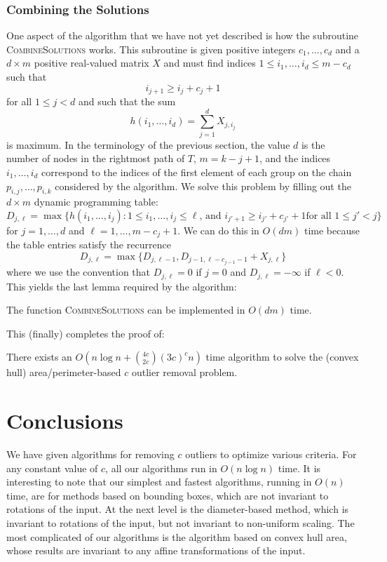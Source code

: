 \documentclass{elsart}
\newcommand{\runtime}{n\log n + {4c\choose 2c}(3c)^cn}
\newcommand{\Oruntime}{O\left(\runtime\right)}
\begin{document}
\subsubsection{Combining the Solutions}

One aspect of the algorithm that we have not yet described is how the
subroutine \textsc{CombineSolutions} works.  This subroutine is given
positive integers $c_1,\ldots,c_d$ and a $d\times m$ positive
real-valued matrix $X$ and must find 
indices $1\le i_1,\ldots,i_d \le m-c_d$ such that
\[
     i_{j+1} \ge i_j + c_j + 1
\]
for all $1\le j < d$ and such that the sum
\[
      h(i_1,\ldots,i_d)=\sum_{j=1}^d X_{j,i_j}
\]
is maximum.  In the terminology of the previous section, the value $d$
is the number of nodes in the rightmost path of $T$, $m=k-j+1$, and
the indices
$i_1,\ldots,i_d$ correspond to the indices of the
first element of each group on the chain $p_{i,j},\ldots,p_{i,k}$
considered by the algorithm.
We solve this problem by filling out the $d\times m$ dynamic
programming table:
\[
     D_{j,\ell} = \max\{h(i_1,\ldots,i_j):
      \mbox{$1\le i_1,\ldots,i_j\le \ell$, and $i_{j'+1} \ge i_{j'}+c_{j'}+1$
             for all $1\le j'< j$}  \} 
\]
for $j=1,\ldots,d$ and $\ell=1,\ldots,m-c_j+1$.  We can do this in
$O(dm)$ time because the table entries satisfy the recurrence
\[
     D_{j,\ell} = \max\{D_{j,\ell-1},D_{j-1,\ell-c_{j-1}-1}+X_{j,\ell} \}
\]
where we use the convention that $D_{j,\ell} = 0$ if $j=0$ and
$D_{j,\ell}=-\infty$ if $\ell<0$.  This yields the last lemma required
by the algorithm:

\begin{lem}
The function \textsc{CombineSolutions} can be implemented in
$O(dm)$ time.
\end{lem}

This (finally) completes the proof of:
\begin{thm}
There exists an 
$\Oruntime$ time
algorithm to solve
the (convex hull) area/perimeter-based $c$ outlier removal problem.
\end{thm}

\section{Conclusions}

We have given algorithms for removing $c$ outliers to optimize various
criteria. For any constant value of $c$, all our algorithms run in
$O(n\log n)$ time.  It is interesting to note that our simplest and
fastest algorithms, running in $O(n)$ time, are for methods based on
bounding boxes, which are not invariant to rotations of the input.  At
the next level is the diameter-based method, which is invariant to
rotations of the input, but not invariant to non-uniform scaling.  The
most complicated of our algorithms is the algorithm based on convex
hull area, whose results are invariant to any affine transformations
of the input.
\end{document}
